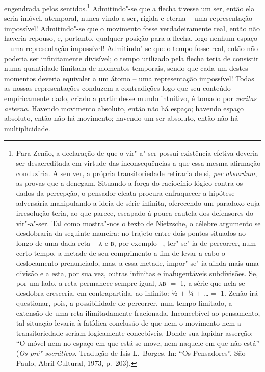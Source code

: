 engendrada pelos sentidos.\footnote{ Para Zenão, a declaração de que o
vir"-a"-ser possui existência efetiva deveria ser desacreditada em
virtude das inconsequências a que essa mesma afirmação conduziria. A
seu ver, a própria transitoriedade retiraria de si, \textit{per
absurdum}, as provas que a denegam. Situando a força do raciocínio
lógico contra os dados da percepção, o pensador eleata procura
enfraquecer a hipótese adversária manipulando a ideia de série
infinita, oferecendo um paradoxo cuja irresolução teria, ao que parece,
escapado à pouca cautela dos defensores do vir"-a"-ser. Tal como
mostra"-nos o texto de Nietzsche, o célebre argumento se desdobraria da
seguinte maneira: no trajeto entre dois pontos situados ao longo de uma
dada reta -- \textsc{a} e \textsc{b}, por exemplo --, ter"-se"-ia de percorrer, num certo
tempo, a metade de seu comprimento a fim de levar a cabo o deslocamento
prenunciado, mas, a essa metade, impor"-se"-ia ainda mais uma divisão e a
esta, por sua vez, outras infinitas e inafugentáveis subdivisões. Se,
por um lado, a reta permanece sempre igual, \textsc{ab} $=$ 1, a série que nela se
desdobra cresceria, em contrapartida, ao infinito: ½ $+$ ¼ $+$ \ldots $=$ 1.
Zenão irá questionar, pois, a possibilidade de percorrer, num tempo
limitado, a extensão de uma reta ilimitadamente fracionada.
Inconcebível ao pensamento, tal situação levaria à fatídica conclusão
de que nem o movimento nem a transitoriedade seriam logicamente
concebíveis. Donde sua lapidar asserção: ``O móvel nem no espaço em que
está se move, nem naquele em que não está'' (\textit{Os pré"-socráticos}.
Tradução de Ísis L.~Borges. In: ``Os Pensadores''. São Paulo, Abril
Cultural, 1973, p.~203).} Admitindo"-se que a flecha tivesse
um ser, então ela seria imóvel, atemporal, nunca vindo a ser, rígida e
eterna -- uma representação impossível! Admitindo"-se que o movimento
fosse verdadeiramente real, então não haveria repouso, e, portanto,
qualquer posição para a flecha, logo nenhum espaço -- uma representação
impossível! Admitindo"-se que o tempo fosse real, então não poderia ser
infinitamente divisível; o tempo utilizado pela flecha teria de
consistir numa quantidade limitada de momentos temporais, sendo que
cada um destes momentos deveria equivaler a um átomo -- uma
representação impossível! Todas as nossas representações conduzem a
contradições logo que seu conteúdo empiricamente dado, criado a partir
desse mundo intuitivo, é tomado por \textit{veritas aeterna}. Havendo
movimento absoluto, então não há espaço; havendo espaço absoluto, então
não há movimento; havendo um ser absoluto, então não há multiplicidade.
